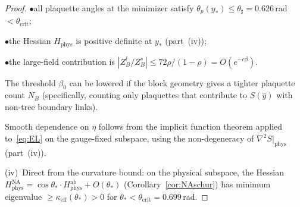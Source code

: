 \documentclass[11pt]{article}
\theoremstyle{definition}
\begin{document}
\begin{proof}
$\bullet$\quad all plaquette angles at the minimizer satisfy
$\theta_p(y_*)\le\theta_\sharp=0.626$\,rad $<\theta_{\mathrm{crit}}$;

$\bullet$\quad the Hessian $H_{\mathrm{phys}}$ is positive
definite at $y_*$ (part~(iv));

$\bullet$\quad the large-field contribution is
$|Z_B^l/Z_B^s|\le 72\rho/(1-\rho)=O(e^{-c\beta})$.

\noindent
The threshold $\beta_0$ can be lowered if the block geometry
gives a tighter plaquette count $N_B$
(specifically, counting only plaquettes that
contribute to $S(\hat{y})$ with non-tree boundary links).

Smooth dependence on $\eta$ follows from the implicit function theorem
applied to~\eqref{eq:EL} on the gauge-fixed subspace, using the
non-degeneracy of $\nabla^2 S|_{\mathrm{phys}}$ (part~(iv)).

(iv)~Direct from the curvature bound: on the physical subspace,
the Hessian $H^{\mathrm{NA}}_{\mathrm{phys}}
=\cos\theta_*\cdot H^{\mathrm{ab}}_{\mathrm{phys}}+O(\theta_*)$
(Corollary~\ref{cor:NAschur}) has minimum eigenvalue
$\ge\kappa_{\mathrm{eff}}(\theta_*)>0$ for $\theta_*<\theta_{\mathrm{crit}}=0.699$\,rad.
\end{proof}
\end{document}
